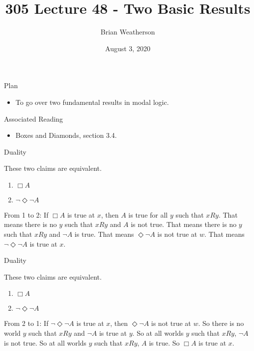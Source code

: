 \documentclass[
  ignorenonframetext,
]{beamer}
\title{305 Lecture 48 - Two Basic Results}
\author{Brian Weatherson}
\date{August 3, 2020}
\providecommand{\tightlist}{%
  \setlength{\itemsep}{0pt}\setlength{\parskip}{0pt}}
\renewcommand{\,}{\text{, }}
\begin{document}
\frame{\titlepage}

\begin{frame}{Plan}
\protect\hypertarget{plan}{}

\begin{itemize}
\tightlist
\item
  To go over two fundamental results in modal logic.
\end{itemize}

\end{frame}

\begin{frame}{Associated Reading}
\protect\hypertarget{associated-reading}{}

\begin{itemize}
\tightlist
\item
  Boxes and Diamonds, section 3.4.
\end{itemize}

\end{frame}

\begin{frame}{Duality}
\protect\hypertarget{duality}{}

These two claims are equivalent.

\begin{enumerate}
\tightlist
\item
  \(\Box A\)
\item
  \(\neg \Diamond \neg A\)\pause
\end{enumerate}

From 1 to 2: If \(\Box A\) is true at \(x\), then \(A\) is true for all
\(y\) such that \(xRy\). That means there is no \(y\) such that \(xRy\)
and \(A\) is not true. That means there is no \(y\) such that \(xRy\)
and \(\neg A\) is true. That means \(\Diamond \neg A\) is not true at
\(w\). That means \(\neg \Diamond \neg A\) is true at \(x\).

\end{frame}

\begin{frame}{Duality}
\protect\hypertarget{duality-1}{}

These two claims are equivalent.

\begin{enumerate}
\tightlist
\item
  \(\Box A\)
\item
  \(\neg \Diamond \neg A\)\pause
\end{enumerate}

From 2 to 1: If \(\neg \Diamond \neg A\) is true at \(x\), then
\(\Diamond \neg A\) is not true at \(w\). So there is no world \(y\)
such that \(xRy\) and \(\neg A\) is true at \(y\). So at all worlds
\(y\) such that \(xRy\), \(\neg A\) is not true. So at all worlds \(y\)
such that \(xRy\), \(A\) is true. So \(\Box A\) is true at \(x\).

\end{frame}
\end{document}
